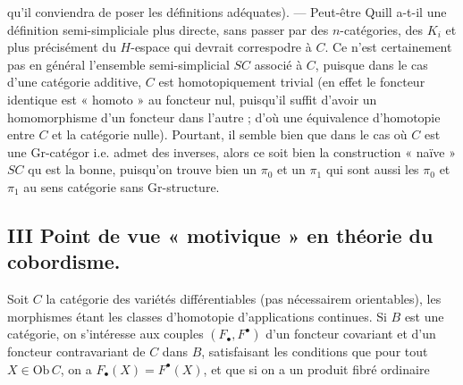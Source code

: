 \documentclass[11pt,a4paper]{article}
\begin{document}
qu'il conviendra de poser les définitions adéquates). --- Peut-être Quill
a-t-il une définition semi-simpliciale plus directe, sans passer par des
$n$-catégories, des $K_{i}$ et plus précisément du $H$-espace qui devrait
correspodre à $C$. Ce n'est certainement pas en général l'ensemble
semi-simplicial $SC$ associé à $C$, puisque dans le cas d'une catégorie
additive, $C$ est homotopiquement trivial (en effet le foncteur identique est
« homoto » au foncteur nul, puisqu'il suffit d'avoir un homomorphisme
d'un foncteur dans l'autre ; d'où une équivalence d'homotopie entre $C$ et la
catégorie nulle). Pourtant, il semble bien que dans le cas où $C$ est une
Gr-catégor i.e. admet des inverses, alors ce soit bien la construction
« naïve » $SC$ qu est la bonne, puisqu'on trouve bien un $\pi_{0}$ et un
$\pi_{1}$ qui sont aussi les $\pi_{0}$ et $\pi_{1}$ au sens catégorie sans
Gr-structure.


\subsection*{III \quad Point de vue « motivique » en théorie du cobordisme.}

Soit $C$ la catégorie des variétés différentiables 
(pas nécessairem orientables), les morphismes étant les classes
d'homotopie d'applications continues. Si $B$ est une catégorie, on s'intéresse
aux couples $(F_{\bullet}, F^{\bullet})$ d'un foncteur covariant et d'un
foncteur contravariant de $C$ dans $B$, satisfaisant les conditions que pour
tout $X \in \mathrm{Ob}\, C$, on a $F_{\bullet}(X) = F^{\bullet}(X)$, et que si
on a un produit fibré ordinaire
\end{document}
